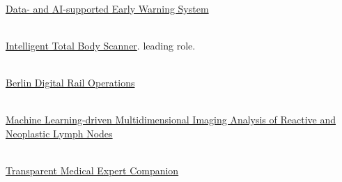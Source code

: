    {
        \\
        \href{https://www.hhi.fraunhofer.de/en/departments/ai/projects/daki-fws.html}{Data- and AI-supported Early Warning System}
    }

    {
        \\
        \href{https://www.hhi.fraunhofer.de/en/departments/ai/projects/itobos.html}{ Intelligent Total Body Scanner}. leading role.
    }

    {
        \\
        \href{https://www.hhi.fraunhofer.de/en/departments/ai/projects/berdiba.html}{Berlin Digital Rail Operations}
    }

    {
        \\
        \href{https://www.hhi.fraunhofer.de/en/departments/ai/projects/patho234.html}{
                     Machine Learning-driven Multidimensional Imaging Analysis
                    of Reactive  and Neoplastic Lymph Nodes}
    }

    {
        \\
        \href{https://www.hhi.fraunhofer.de/en/departments/ai/projects/trameexco.html}{Transparent Medical Expert Companion}
    }


\fi
